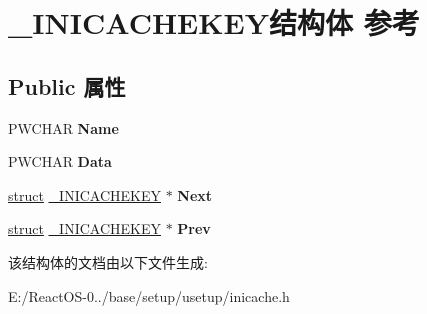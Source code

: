 \hypertarget{struct___i_n_i_c_a_c_h_e_k_e_y}{}\section{\+\_\+\+I\+N\+I\+C\+A\+C\+H\+E\+K\+E\+Y结构体 参考}
\label{struct___i_n_i_c_a_c_h_e_k_e_y}
\subsection*{Public 属性}
\begin{DoxyCompactItemize}
\item 
\mbox{\label{struct___i_n_i_c_a_c_h_e_k_e_y_aabded73936a4c8d988ab459eab6940a1}} 
P\+W\+C\+H\+AR {\bfseries Name}
\item 
\mbox{\label{struct___i_n_i_c_a_c_h_e_k_e_y_ab2329dbccaefcf8f3911dcb210b43b50}} 
P\+W\+C\+H\+AR {\bfseries Data}
\item 
\mbox{\label{struct___i_n_i_c_a_c_h_e_k_e_y_a34de1e4c14545a31a8670fcbedb67648}} 
\hyperlink{interfacestruct}{struct} \hyperlink{struct___i_n_i_c_a_c_h_e_k_e_y}{\+\_\+\+I\+N\+I\+C\+A\+C\+H\+E\+K\+EY} $\ast$ {\bfseries Next}
\item 
\mbox{\label{struct___i_n_i_c_a_c_h_e_k_e_y_ad59ccd2ea30234722b4c18a3f154a942}} 
\hyperlink{interfacestruct}{struct} \hyperlink{struct___i_n_i_c_a_c_h_e_k_e_y}{\+\_\+\+I\+N\+I\+C\+A\+C\+H\+E\+K\+EY} $\ast$ {\bfseries Prev}
\end{DoxyCompactItemize}


该结构体的文档由以下文件生成\+:\begin{DoxyCompactItemize}
\item 
E\+:/\+React\+O\+S-\/0../base/setup/usetup/inicache.\+h\end{DoxyCompactItemize}
